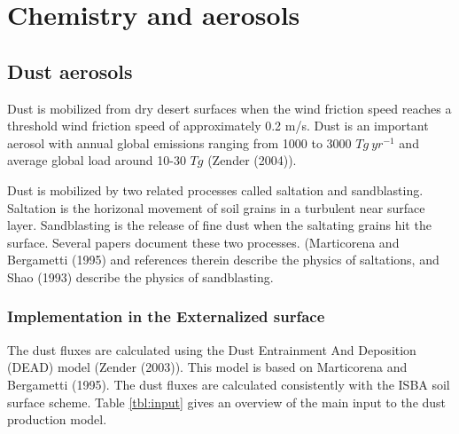 
\chapter{Chemistry and aerosols}
\minitoc


\section{Dust aerosols}

Dust is mobilized from dry desert surfaces when the wind friction 
speed reaches a threshold wind friction speed of approximately
0.2 m/s. Dust is an important aerosol with annual global
 emissions ranging from 1000 to 3000 $Tg~yr^{-1}$ and average global
load around 10-30 $Tg$ (Zender \etal (2004)\nocite{Zender2004}).

Dust is mobilized by two related processes called saltation and 
sandblasting. Saltation is the horizonal movement of soil grains in a turbulent
near surface layer. Sandblasting is the release of fine dust when 
the saltating grains hit the surface. Several papers document these two
processes. (Marticorena and Bergametti (1995)\nocite{Marticorena1995} and references therein describe the physics
of saltations, and Shao \etal (1993)\nocite{Shao1993} describe the physics of sandblasting.


\subsection{Implementation in the Externalized surface}

The dust fluxes are calculated using the Dust Entrainment And Deposition
(DEAD) model (Zender \etal (2003)\nocite{Zender2003}). This model is based on Marticorena and Bergametti (1995).
The dust fluxes are calculated consistently with the ISBA soil surface
scheme. Table \ref{tbl:input} gives an overview of the main input to the dust 
production model.


